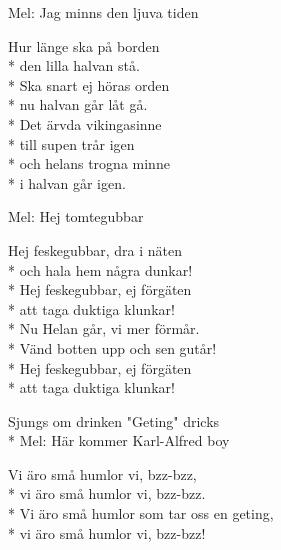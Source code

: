 \begin{SongText}
\begin{SongInfo}
    Mel: Jag minns den ljuva tiden
\end{SongInfo}
\begin{SongVerse}
    Hur länge ska på borden\\*%
    den lilla halvan stå.\\*%
    Ska snart ej höras orden\\*%
    nu halvan går låt gå.\\*%
    Det ärvda vikingasinne\\*%
    till supen trår igen\\*%
    och helans trogna minne\\*%
    i halvan går igen.
\end{SongVerse}
\end{SongText}
\begin{SongText}
\begin{SongInfo}
    Mel: Hej tomtegubbar
\end{SongInfo}
\begin{SongVerse}
    Hej feskegubbar, dra i näten\\*%
    och hala hem några dunkar!\\*%
    Hej feskegubbar, ej förgäten\\*%
    att taga duktiga klunkar!\\*%
    Nu Helan går, vi mer förmår.\\*%
    Vänd botten upp och sen gutår!\\*%
    Hej feskegubbar, ej förgäten\\*%
    att taga duktiga klunkar!
\end{SongVerse}
\end{SongText}
\begin{SongText}[Humlorna]
\begin{SongInfo}
    Sjungs om drinken "Geting" dricks\\*%
    Mel: Här kommer Karl-Alfred boy
\end{SongInfo}
\begin{SongVerse}
    Vi äro små humlor vi, bzz-bzz,\\*%
    vi äro små humlor vi, bzz-bzz.\\*%
    Vi äro små humlor som tar oss en geting,\\*%
    vi äro små humlor vi, bzz-bzz!
\end{SongVerse}
\end{SongText}
